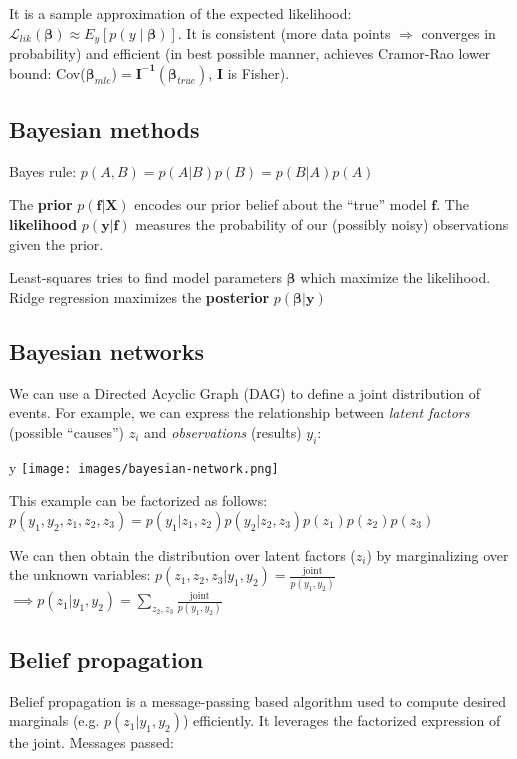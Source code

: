 \documentclass[10pt,a4paper,landscape]{article}
\renewcommand{\bf}[1]{\ensuremath{\mathbf{#1}}}
\newcommand{\bbeta}{\boldsymbol\beta}
\begin{document}
\begin{multicols*}{4}
It is a sample approximation of the expected likelihood:
$\mathcal{L}_{lik}(\bbeta) \approx E_y[ p(y \mid \bbeta) ]$.
It is consistent (more data points $\Rightarrow$ converges in probability) and efficient (in best possible manner, achieves Cramor-Rao lower bound: Cov($\bbeta_{mle}$)$=\bf{I^{-1}}(\bbeta_{true})$, $\bf{I}$ is Fisher).

\subsection{Bayesian methods}
Bayes rule: $p(A, B) = p(A|B) p(B) = p(B|A) p(A)$

The \textbf{prior} $p(\bf{f}|\bf{X})$ encodes our prior belief about the ``true'' model $\bf{f}$. The \textbf{likelihood} $p(\bf{y}|\bf{f})$ measures the probability of our (possibly noisy) observations given the prior.

Least-squares tries to find model parameters $\bbeta$ which maximize the likelihood. Ridge regression maximizes the \textbf{posterior} $p(\bbeta|\bf{y})$

\subsection{Bayesian networks}
We can use a Directed Acyclic Graph (DAG) to define a joint distribution of events. For example, we can express the relationship between \textit{latent factors} (possible ``causes'') $z_i$ and \textit{observations} (results) $y_i$:

\begin{colfig}
  \centering
y  \texttt{[image: images/bayesian-network.png]}
\end{colfig}

This example can be factorized as follows:
$p(y_1, y_2, z_1, z_2, z_3) = p(y_1 | z_1, z_2) p(y_2 | z_2, z_3) p(z_1) p(z_2) p(z_3)$

We can then obtain the distribution over latent factors ($z_i$) by marginalizing over the unknown variables:
$p(z_1, z_2, z_3 | y_1, y_2) = \frac{\text{joint}}{p(y_1, y_2)}$\\
$\implies p(z_1 | y_1, y_2) = \sum_{z_2, z_3} \frac{\text{joint}}{p(y_1, y_2)}$

\subsection{Belief propagation}
Belief propagation is a message-passing based algorithm used to compute desired marginals (e.g. $p(z_1 | y_1, y_2)$) efficiently. It leverages the factorized expression of the joint. Messages passed:


\end{multicols*}
\end{document}

